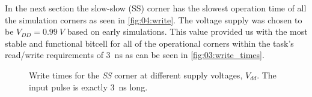 In the next section the slow-slow (SS) corner has the slowest operation time of all the simulation corners as seen in \autoref{fig:04:write}. The voltage supply was chosen to be $V_{DD} = \SI{0.99}{V}$ based on early simulations. This value provided us with the most stable and functional bitcell for all of the operational corners within the task's read/write requirements of \SI{3}{ns} as can be seen in \autoref{fig:03:write_times}.

\begin{figure}[H]%
\centering
{}%
\qquad
{}%
\qquad
{}%
\caption{Write times for the \textit{SS} corner at different supply voltages, $V_{dd}$. The input pulse is exactly \SI{3}{ns} long.}
\label{fig:03:write_times}
\end{figure}

